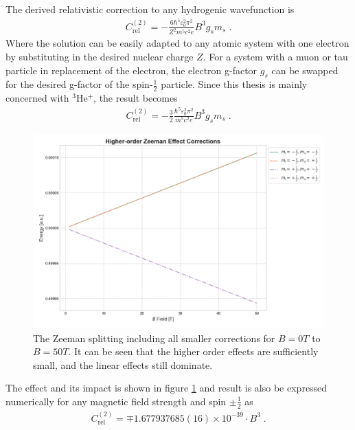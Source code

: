         \noindent The derived relativistic correction to any hydrogenic wavefunction is
        \begin{align}
            C_{\text{rel}}^{(2)} = - \frac{6\hbar^5 \varepsilon_0^2 \pi^2}{Z^2 m^5 c^2 e} B^3 g_s m_s\;.
        \end{align}
        \noindent Where the solution can be easily adapted to any atomic system with one electron by substituting in the desired nuclear charge $Z$. For a system with a muon or tau particle in replacement of the electron, the electron g-factor $g_s$ can be swapped for the desired g-factor of the spin-$\frac{1}{2}$ particle. Since this thesis is mainly concerned with $^3$He$^+$, the result becomes
        \begin{align}
            C_{\text{rel}}^{(2)} = - \frac{3}{2}\frac{\hbar^5 \varepsilon_0^2 \pi^2}{ m^5 c^2 e} B^3 g_s m_s\;.
        \end{align}
        \begin{figure}[h]
            \begin{center}
                \includegraphics[width=0.85\linewidth]{Zeeman_Graph.png}
                \caption{The Zeeman splitting including all smaller corrections for $B=0T$ to $B=50T$. It can be seen that the higher order effects are sufficiently small, and the linear effects still dominate.}\label{fig:d}
            \end{center}
        \end{figure}
        \noindent The effect and its impact is shown in figure \ref{fig:d} and result is also be expressed numerically for any magnetic field strength and spin $\pm \frac{1}{2}$ as
        \begin{align}
            C_{\text{rel}}^{(2)} = \mp 1.677937685(16)\times 10^{-39} \cdot B^3\;.
        \end{align}
